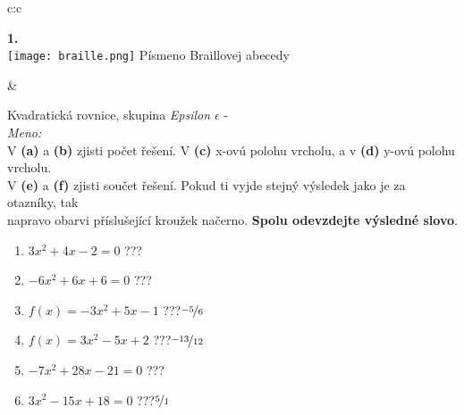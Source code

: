 \documentclass[10pt]{report}
\begin{document}
\begin{tabular}{c:c}
\begin{minipage}[c][99mm][t]{0.49\linewidth}
\begin{center}
\begin{minipage}{0.20\linewidth}
\begin{center}
{\Huge\bfseries 1.} \\[2mm]
\texttt{[image: braille.png]}
{\small Písmeno Braillovej abecedy}
\end{center}
\end{minipage}
\end{center}
\end{minipage}
&
\begin{minipage}[c][99mm][t]{0.49\linewidth}
\begin{center}
\vspace{7mm}
{\huge Kvadratická rovnice, skupina \textit{Epsilon $\epsilon$} -}\\[4.5mm]
\textit{Meno:}\phantom{xxxxxxxxxxxxxxxxxxxxxxxxxxxxxxxxxxxxxxxxxxxxxxxxxxxxxxxxxxxxxxxxx}\\[3.5mm]
V \textbf{(a)} a \textbf{(b)} zjisti počet řešení. V \textbf{(c)} x-ovú polohu vrcholu, a v \textbf{(d)} y-ovú polohu vrcholu.\\V \textbf{(e)} a \textbf{(f)} zjisti součet řešení. Pokud ti vyjde stejný výsledek jako je za otazníky, tak\\napravo obarvi příslušející kroužek načerno. \textbf{Spolu odevzdejte výsledné slovo}.\\[3mm]
\begin{minipage}{0.77\linewidth}
\begin{center}
\begin{varwidth}{\textwidth}
\begin{enumerate}
\large
\item $3x^2+4x-2=0$\quad \dotfill\; ???\;\dotfill {}
\item $-6x^2+6x+6=0$\quad \dotfill\; ???\;\dotfill {}
\item $f(x)=-3x^2+5x-1$\quad \dotfill\; ???\;\dotfill \quad $\nicefrac{-5}{6}$
\item $f(x)=3x^2-5x+2$\quad \dotfill\; ???\;\dotfill \quad $\nicefrac{-13}{12}$
\item $-7x^2+28x-21=0$\quad \dotfill\; ???\;\dotfill {}
\item $3x^2-15x+18=0$\quad \dotfill\; ???\;\dotfill \quad $\nicefrac{5}{1}$
\end{enumerate}
\end{varwidth}
\end{center}
\end{minipage}
\begin{minipage}{0.20\linewidth}

\end{minipage}
\end{center}
\end{minipage}
\end{tabular}
\end{document}
